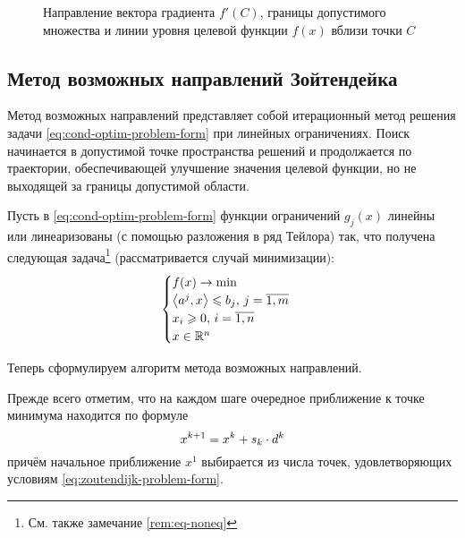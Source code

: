 \begin{itemize}
\begin{figure}[!h]
    \caption[Задача \eqref{eq:cond-optim-problem} вблизи
    $C$]{Направление вектора градиента $f'(C)$, границы допустимого
      множества и линии уровня целевой функции $f(x)$ вблизи точки
      $C$}
    \label{fig:cond-optim-zoom}
  \end{figure}
\end{itemize}

\clearpage
\subsection{Метод возможных направлений Зойтендейка}
\label{sec:zoutendijk}

Метод возможных направлений представляет собой итерационный метод
решения задачи \eqref{eq:cond-optim-problem-form} при линейных
ограничениях. Поиск начинается в допустимой точке пространства решений
и продолжается по траектории, обеспечивающей улучшение значения
целевой функции, но не выходящей за границы допустимой области.

Пусть в \eqref{eq:cond-optim-problem-form} функции ограничений
$g_j(x)$ линейны или линеаризованы (с помощью разложения в ряд
Тейлора) так, что получена следующая задача\footnote{См. также
  замечание \ref{rem:eq-noneq}} (рассматривается случай минимизации):
\begin{equation}
  \label{eq:zoutendijk-problem-form}
  \begin{cases}
    f(x) \to \min \\
    {\left \langle a^j,x \right \rangle} \leqslant b_j,\, j=\overline{1,m} \\
    x_i \geqslant 0,\, i=\overline{1,n} \\
    x \in \mathbb{R}^n
  \end{cases}
\end{equation}

Теперь сформулируем алгоритм метода возможных направлений.

Прежде всего отметим, что на каждом шаге очередное приближение к точке
минимума находится по формуле
\begin{equation}
  \label{eq:zoutendijk-iter}
  x^{k+1} = x^k + s_k \cdot d^k
\end{equation}
причём начальное приближение $x^1$ выбирается из числа точек,
удовлетворяющих условиям \eqref{eq:zoutendijk-problem-form}.

